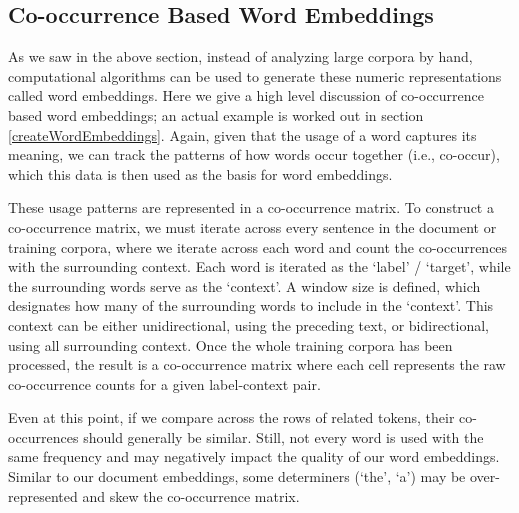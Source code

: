 

\subsection{Co-occurrence Based Word Embeddings}

As we saw in the above section, instead of analyzing large corpora by hand, computational algorithms can be used to generate these numeric representations called word embeddings. Here we give a high level discussion of co-occurrence based word embeddings; an actual example is worked out in section \ref{createWordEmbeddings}. Again, given that the usage of a word captures its meaning, we can track the patterns of how words occur together (i.e., co-occur), which this data is then used as the basis for word embeddings.

These usage patterns are represented in a co-occurrence matrix. To construct a co-occurrence matrix, we must iterate across every sentence in the document or training corpora, where we iterate across each word and count the co-occurrences with the surrounding context. Each word is iterated as the `label' / `target', while the surrounding words serve as the `context'. A window size is defined, which designates how many of the surrounding words to include in the `context'. This context can be either unidirectional, using the preceding text, or bidirectional, using all surrounding context. Once the whole training corpora has been processed, the result is a co-occurrence matrix where each cell represents the raw co-occurrence counts for a given label-context pair. 

Even at this point, if we compare across the rows of related tokens, their co-occurrences should generally be similar. Still, not every word is used with the same frequency and may negatively impact the quality of our word embeddings. Similar to our document embeddings, some determiners (`the', `a') may be over-represented and skew the co-occurrence matrix. 

